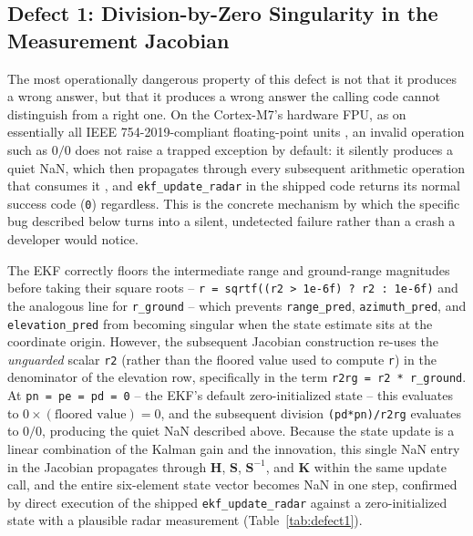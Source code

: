 \documentclass[conference]{IEEEtran}
\begin{document}
\subsection{Defect 1: Division-by-Zero Singularity in the Measurement Jacobian}

The most operationally dangerous property of this defect is not that it produces a wrong answer, but that it produces a wrong answer the calling code cannot distinguish from a right one. On the Cortex-M7's hardware FPU, as on essentially all IEEE 754-2019-compliant floating-point units \cite{r16}, an invalid operation such as $0/0$ does not raise a trapped exception by default: it silently produces a quiet NaN, which then propagates through every subsequent arithmetic operation that consumes it \cite{r17}, and \texttt{ekf\_update\_radar} in the shipped code returns its normal success code (\texttt{0}) regardless. This is the concrete mechanism by which the specific bug described below turns into a silent, undetected failure rather than a crash a developer would notice.

The EKF correctly floors the intermediate range and ground-range magnitudes before taking their square roots -- \texttt{r = sqrtf((r2 > 1e-6f) ? r2 : 1e-6f)} and the analogous line for \texttt{r\_ground} -- which prevents \texttt{range\_pred}, \texttt{azimuth\_pred}, and \texttt{elevation\_pred} from becoming singular when the state estimate sits at the coordinate origin. However, the subsequent Jacobian construction re-uses the \emph{unguarded} scalar \texttt{r2} (rather than the floored value used to compute \texttt{r}) in the denominator of the elevation row, specifically in the term \texttt{r2rg = r2 * r\_ground}. At \texttt{pn = pe = pd = 0} -- the EKF's default zero-initialized state -- this evaluates to $0 \times (\text{floored value}) = 0$, and the subsequent division \texttt{(pd*pn)/r2rg} evaluates to $0/0$, producing the quiet NaN described above. Because the state update is a linear combination of the Kalman gain and the innovation, this single NaN entry in the Jacobian propagates through $\mathbf{H}$, $\mathbf{S}$, $\mathbf{S}^{-1}$, and $\mathbf{K}$ within the same update call, and the entire six-element state vector becomes NaN in one step, confirmed by direct execution of the shipped \texttt{ekf\_update\_radar} against a zero-initialized state with a plausible radar measurement (Table~\ref{tab:defect1}).
\end{document}
